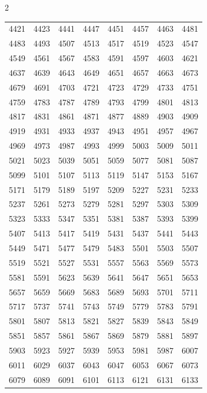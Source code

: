 \documentclass{article}
\begin{document}
\begin{multicols}{2}
\begin{tabular}{r r r r r r r r}
4421 & 4423 & 4441 & 4447 & 4451 & 4457 & 4463 & 4481\\
4483 & 4493 & 4507 & 4513 & 4517 & 4519 & 4523 & 4547\\
4549 & 4561 & 4567 & 4583 & 4591 & 4597 & 4603 & 4621\\
4637 & 4639 & 4643 & 4649 & 4651 & 4657 & 4663 & 4673\\
4679 & 4691 & 4703 & 4721 & 4723 & 4729 & 4733 & 4751\\
4759 & 4783 & 4787 & 4789 & 4793 & 4799 & 4801 & 4813\\
4817 & 4831 & 4861 & 4871 & 4877 & 4889 & 4903 & 4909\\
4919 & 4931 & 4933 & 4937 & 4943 & 4951 & 4957 & 4967\\
4969 & 4973 & 4987 & 4993 & 4999 & 5003 & 5009 & 5011\\
5021 & 5023 & 5039 & 5051 & 5059 & 5077 & 5081 & 5087\\
5099 & 5101 & 5107 & 5113 & 5119 & 5147 & 5153 & 5167\\
5171 & 5179 & 5189 & 5197 & 5209 & 5227 & 5231 & 5233\\
5237 & 5261 & 5273 & 5279 & 5281 & 5297 & 5303 & 5309\\
5323 & 5333 & 5347 & 5351 & 5381 & 5387 & 5393 & 5399\\
5407 & 5413 & 5417 & 5419 & 5431 & 5437 & 5441 & 5443\\
5449 & 5471 & 5477 & 5479 & 5483 & 5501 & 5503 & 5507\\
5519 & 5521 & 5527 & 5531 & 5557 & 5563 & 5569 & 5573\\
5581 & 5591 & 5623 & 5639 & 5641 & 5647 & 5651 & 5653\\
5657 & 5659 & 5669 & 5683 & 5689 & 5693 & 5701 & 5711\\
5717 & 5737 & 5741 & 5743 & 5749 & 5779 & 5783 & 5791\\
5801 & 5807 & 5813 & 5821 & 5827 & 5839 & 5843 & 5849\\
5851 & 5857 & 5861 & 5867 & 5869 & 5879 & 5881 & 5897\\
5903 & 5923 & 5927 & 5939 & 5953 & 5981 & 5987 & 6007\\
6011 & 6029 & 6037 & 6043 & 6047 & 6053 & 6067 & 6073\\
6079 & 6089 & 6091 & 6101 & 6113 & 6121 & 6131 & 6133\\
\end{tabular}


\end{multicols}
\end{document}
